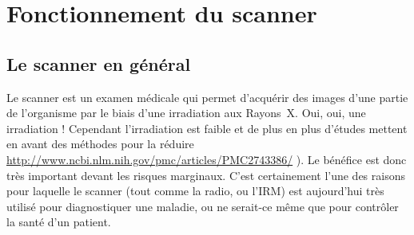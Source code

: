 \documentclass[main.tex]{subfiles}
\begin{document}
%

\section{Fonctionnement du scanner}
\subsection{Le scanner en général}
Le scanner est un examen médicale qui permet d'acquérir des images d'une partie de l'organisme par le biais d'une irradiation aux Rayons~X. Oui, oui, une irradiation ! Cependant l'irradiation est faible et de plus en plus d'études mettent en avant des méthodes pour la réduire  \url{http://www.ncbi.nlm.nih.gov/pmc/articles/PMC2743386/} ). Le bénéfice est donc très important devant les risques marginaux. C'est certainement l'une des raisons pour laquelle le scanner (tout comme la radio, ou l'IRM) est aujourd'hui très utilisé pour diagnostiquer une maladie, ou ne serait-ce même que pour contrôler la santé d'un patient.
\end{document}
